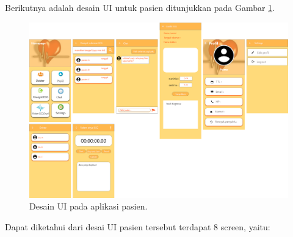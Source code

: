 \clearpage
Berikutnya adalah desain UI untuk pasien ditunjukkan pada Gambar \ref{fig:3.3}.
\begin{figure}[H] \centering
	\includegraphics[width=1\textwidth]{img/pasienUI.png}
	\caption{Desain UI pada aplikasi pasien.}
	\label{fig:3.3}
\end{figure}
\vspace{1ex}
Dapat diketahui dari desai UI pasien tersebut terdapat 8 screen, yaitu:
